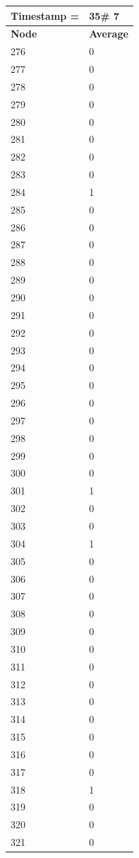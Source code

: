 \begin{tabular}{|l||l|}
\hline
\textbf{Timestamp =} & \textbf{35}\# 7\\\hline
	\textbf{Node} & \textbf{Average} \\ \hline
\hline
	276 & 0 \\ \hline
	277 & 0 \\ \hline
	278 & 0 \\ \hline
	279 & 0 \\ \hline
	280 & 0 \\ \hline
	281 & 0 \\ \hline
	282 & 0 \\ \hline
	283 & 0 \\ \hline
	284 & 1 \\ \hline
	285 & 0 \\ \hline
	286 & 0 \\ \hline
	287 & 0 \\ \hline
	288 & 0 \\ \hline
	289 & 0 \\ \hline
	290 & 0 \\ \hline
	291 & 0 \\ \hline
	292 & 0 \\ \hline
	293 & 0 \\ \hline
	294 & 0 \\ \hline
	295 & 0 \\ \hline
	296 & 0 \\ \hline
	297 & 0 \\ \hline
	298 & 0 \\ \hline
	299 & 0 \\ \hline
	300 & 0 \\ \hline
	301 & 1 \\ \hline
	302 & 0 \\ \hline
	303 & 0 \\ \hline
	304 & 1 \\ \hline
	305 & 0 \\ \hline
	306 & 0 \\ \hline
	307 & 0 \\ \hline
	308 & 0 \\ \hline
	309 & 0 \\ \hline
	310 & 0 \\ \hline
	311 & 0 \\ \hline
	312 & 0 \\ \hline
	313 & 0 \\ \hline
	314 & 0 \\ \hline
	315 & 0 \\ \hline
	316 & 0 \\ \hline
	317 & 0 \\ \hline
	318 & 1 \\ \hline
	319 & 0 \\ \hline
	320 & 0 \\ \hline
	321 & 0 \\ \hline
\end{tabular}
